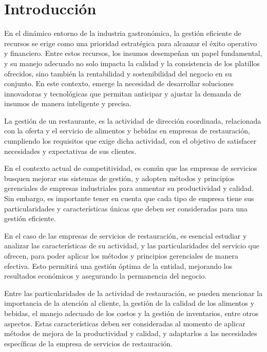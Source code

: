 \fancyhead{}
\fancyfoot{}
\cfoot{\thepage}

\chapter{Introducción}

En el dinámico entorno de la industria gastronómica, la gestión eficiente de recursos se erige como una prioridad estratégica para alcanzar el éxito operativo y financiero. Entre estos recursos, los insumos desempeñan un papel fundamental, y su manejo adecuado no solo impacta la calidad y la consistencia de los platillos ofrecidos, sino también la rentabilidad y sostenibilidad del negocio en su conjunto. En este contexto, emerge la necesidad de desarrollar soluciones innovadoras y tecnológicas que permitan anticipar y ajustar la demanda de insumos de manera inteligente y precisa.

La gestión de un restaurante, es la actividad de dirección coordinada, relacionada con la oferta y el servicio de alimentos y bebidas en empresas de restauración, cumpliendo los requisitos que exige dicha actividad, con el objetivo de satisfacer necesidades y expectativas de sus clientes.

En el contexto actual de competitividad, es común que las empresas de servicios busquen mejorar sus sistemas de gestión, y adopten métodos y principios gerenciales de empresas industriales para aumentar su productividad y calidad. Sin embargo, es importante tener en cuenta que cada tipo de empresa tiene sus particularidades y características únicas que deben ser consideradas para una gestión eficiente.

En el caso de las empresas de servicios de restauración, es esencial estudiar y analizar las características de su actividad, y las particularidades del servicio que ofrecen, para poder aplicar los métodos y principios gerenciales de manera efectiva. Esto permitirá una gestión óptima de la entidad, mejorando los resultados económicos y asegurando la permanencia del negocio.

Entre las particularidades de la actividad de restauración, se pueden mencionar la importancia de la atención al cliente, la gestión de la calidad de los alimentos y bebidas, el manejo adecuado de los costos y la gestión de inventarios, entre otros aspectos. Estas características deben ser consideradas al momento de aplicar métodos de mejora de la productividad y calidad, y adaptarlos a las necesidades específicas de la empresa de servicios de restauración.


